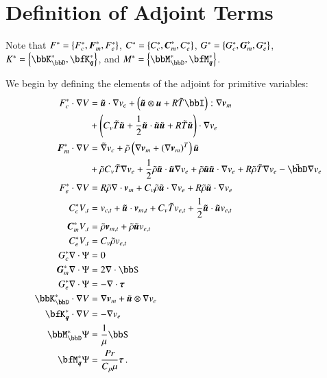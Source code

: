 \documentclass[preprint,12pt]{elsarticle}
\begin{document}
\section{Definition of Adjoint Terms}
\label{ap:adjoint}

Note that $F^*=\left\{ F^*_c,\boldsymbol F^*_m,F^*_e \right\}$, $C^*=\left\{ C^*_c,\boldsymbol C^*_m,C^*_e \right\}$, $G^*=\left\{ G^*_c,\boldsymbol G^*_m,G^*_e \right\}$, $K^*=\LRc{\bbK^*_\bbD,\bfK^*_{\bfq}}$,
and $M^*=\LRc{\bbM^*_\bbD,\bfM^*_{\bfq}}$.

We begin by defining the elements of the adjoint for primitive variables:
\begin{align*}
F^*_c\cdot\Grad V&=\tilde\bfu\cdot\Grad v_c
+\LRp{\tilde\bfu\otimes\bfu+R\tilde T\bbI}:\Grad\bfv_m\\
&+\LRp{C_v\tilde T\tilde\bfu+\frac{1}{2}\tilde\bfu\cdot\tilde\bfu\tilde\bfu+R\tilde T\tilde\bfu}\cdot\Grad v_e\\
\bfF^*_m\cdot\Grad V&=\tilde\Grad v_c
+\tilde\rho\LRp{\Grad\bfv_m+(\Grad\bfv_m)^T}\tilde\bfu\\
&+\tilde\rho C_v\tilde T\Grad v_e+\frac{1}{2}\tilde\rho\tilde\bfu\cdot\tilde\bfu\Grad v_e
+\tilde\rho\tilde\bfu\tilde\bfu\cdot\Grad v_e+R\tilde\rho\tilde T\Grad v_e
-\tilde\bbD\Grad v_e\\
F^*_e\cdot\Grad V&=R\tilde\rho\Div\bfv_m
+C_v\tilde\rho\tilde\bfu\cdot\Grad v_e+R\tilde\rho\tilde\bfu\cdot\Grad v_e\\
%
C^*_cV_{,t}&=v_{c,t}+\tilde\bfu\cdot\bfv_{m,t}+C_v\tilde T v_{e,t}+\frac{1}{2}\tilde\bfu\cdot\tilde\bfu v_{e,t}\\
\bfC^*_mV_{,t}&=\tilde\rho\bfv_{m,t}+\tilde\rho\tilde\bfu v_{e,t}\\
C^*_eV_{,t}&=C_v\tilde\rho v_{e,t}\\
%
G^*_c\Div\Psi&=0\\
\bfG^*_m\Div\Psi&=2\Div\bbS\\
G^*_e\Div\Psi&=-\Div\bftau\\
%
\bbK^*_\bbD\cdot\Grad V&=\Grad\bfv_m+\tilde\bfu\otimes\Grad v_e\\
\bfK^*_{\bfq}\cdot\Grad V&=-\Grad v_e\\
%
\bbM^*_\bbD\Psi&=\frac{1}{\mu}\bbS\\
\bfM^*_{\bfq}\Psi&=\frac{Pr}{C_p\mu}\bftau\,.
\end{align*}
\end{document}
